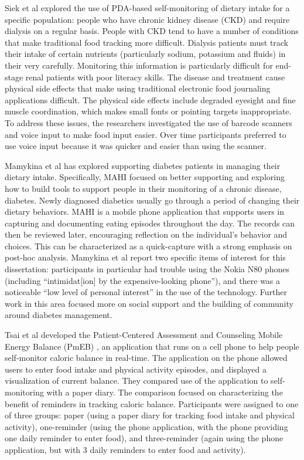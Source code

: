 Siek et al \citep{siek_bridging_2009, siek_design_2006, siek_when_2006} explored the use of PDA-based self-monitoring of dietary intake for a specific population: people who have chronic kidney disease (CKD) and require dialysis on a regular basis. People with CKD tend to have a number of conditions that make traditional food tracking more difficult. Dialysis patients must track their intake of certain nutrients (particularly sodium, potassium and fluids) in their  very carefully. Monitoring this information is particularly difficult for end-stage renal patients with poor literacy skills. The disease and treatment cause physical side effects that make using traditional electronic food journaling applications difficult. The physical side effects include degraded eyesight and fine muscle coordination, which makes small fonts or pointing targets inappropriate. To address these issues, the researchers investigated the use of barcode scanners and voice input to make food input easier. Over time participants preferred to use voice input because it was quicker and easier than using the scanner. 

Mamykina et al \citep{mamykina_examining_2011, mamykina_mahi:_2008} has explored supporting diabetes patients in managing their dietary intake. Specifically, MAHI focused on better supporting and exploring how to build tools to support people in their monitoring of a chronic disease, diabetes. Newly diagnosed diabetics usually go through a period of changing their dietary behaviors. MAHI is a mobile phone application that supports users in capturing and documenting eating episodes throughout the day. The records can then be reviewed later, encouraging reflection on the individual's behavior and choices. This can be characterized as a quick-capture with a strong emphasis on post-hoc analysis. Mamykina et al report \citep{mamykina_mahi:_2008} two specific items of interest for this dissertation: participants in particular had trouble using the Nokia N80 phones (including ``intimidat[ion] by the expensive-looking phone''), and there was a noticeable ``low level of personal interest'' in the use of the technology. Further work in this area focused more on social support and the building of community around diabetes management. 

Tsai et al developed the Patient-Centered Assessment and Counseling Mobile Energy Balance (PmEB) \citep{tsai_usability_2007},  an application that runs on a cell phone to help people self-monitor caloric balance in real-time.  The application on the phone allowed users to enter food intake and physical activity episodes, and displayed a visualization of current balance. They compared use of the application to self-monitoring with a paper diary. The comparison focused on characterizing the benefit of reminders in tracking caloric balance. Participants were assigned to one of three groups: paper (using a paper diary for tracking food intake and physical activity), one-reminder (using the phone application, with the phone providing one daily reminder to enter food), and three-reminder (again using the phone application, but with 3 daily reminders to enter food and activity). 


